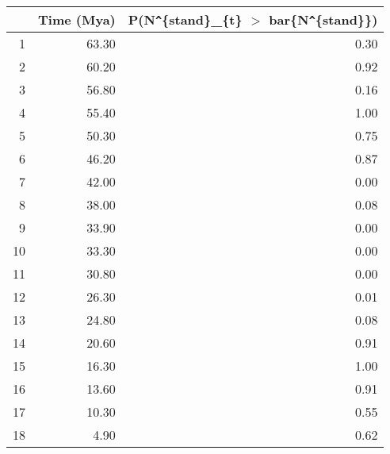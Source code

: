 \begin{table}[ht]
\centering
\begin{tabular}{rrr}
  \hline
 & Time (Mya) & P(N\verb|^|\{stand\}\_\{t\} $>$ bar\{N\verb|^|\{stand\}\}) \\ 
  \hline
1 & 63.30 & 0.30 \\ 
  2 & 60.20 & 0.92 \\ 
  3 & 56.80 & 0.16 \\ 
  4 & 55.40 & 1.00 \\ 
  5 & 50.30 & 0.75 \\ 
  6 & 46.20 & 0.87 \\ 
  7 & 42.00 & 0.00 \\ 
  8 & 38.00 & 0.08 \\ 
  9 & 33.90 & 0.00 \\ 
  10 & 33.30 & 0.00 \\ 
  11 & 30.80 & 0.00 \\ 
  12 & 26.30 & 0.01 \\ 
  13 & 24.80 & 0.08 \\ 
  14 & 20.60 & 0.91 \\ 
  15 & 16.30 & 1.00 \\ 
  16 & 13.60 & 0.91 \\ 
  17 & 10.30 & 0.55 \\ 
  18 & 4.90 & 0.62 \\ 
   \hline
\end{tabular}
\label{tab:div_peak}
\end{table}
